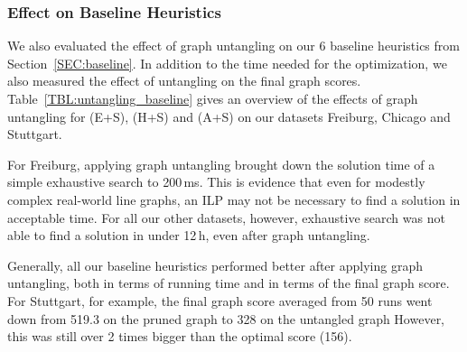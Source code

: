 \documentclass[format=acmsmall, review=false, screen=true]{acmart}
\begin{document}
\subsubsection{Effect on Baseline Heuristics}

We also evaluated the effect of graph untangling on our 6 baseline heuristics from Section~\ref{SEC:baseline}. In addition to the time needed for the optimization, we also measured the effect of untangling on the final graph scores.
Table~\ref{TBL:untangling_baseline} gives an overview of the effects of graph untangling for (E+S), (H+S) and (A+S) on our datasets Freiburg, Chicago and Stuttgart.

For Freiburg, applying graph untangling brought down the solution time of a simple exhaustive search to 200\,ms.
This is evidence that even for modestly complex real-world line graphs, an ILP may not be necessary to find a solution in acceptable time.
For all our other datasets, however, exhaustive search was not able to find a solution in under 12\,h, even after graph untangling.

Generally, all our baseline heuristics performed better after applying graph untangling, both in terms of running time and in terms of the final graph score.
For Stuttgart, for example, the final graph score averaged from 50 runs went down from 519.3 on the pruned graph to 328 on the untangled graph
 However, this was still over 2 times bigger than the optimal score (156).
\end{document}
